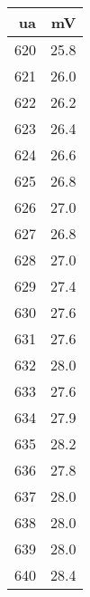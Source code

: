 \begin{tabular}{rr}
\toprule
ua & mV \\
\midrule
620 & 25.8 \\
621 & 26.0 \\
622 & 26.2 \\
623 & 26.4 \\
624 & 26.6 \\
625 & 26.8 \\
626 & 27.0 \\
627 & 26.8 \\
628 & 27.0 \\
629 & 27.4 \\
630 & 27.6 \\
631 & 27.6 \\
632 & 28.0 \\
633 & 27.6 \\
634 & 27.9 \\
635 & 28.2 \\
636 & 27.8 \\
637 & 28.0 \\
638 & 28.0 \\
639 & 28.0 \\
640 & 28.4 \\
\bottomrule
\end{tabular}

